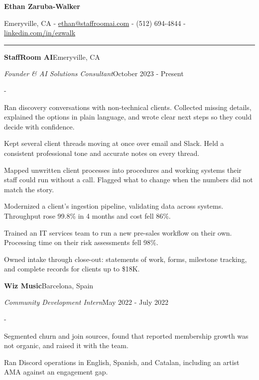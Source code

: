 \documentclass[10pt,letterpaper]{article}
\newenvironment{cvitems}{%
  \begin{list}{-}{%
    \setlength{\leftmargin}{12pt}%
    \setlength{\itemsep}{1.2pt}%
    \setlength{\parsep}{0pt}%
    \setlength{\topsep}{1.5pt}%
    \setlength{\partopsep}{0pt}%
    \setlength{\labelwidth}{6pt}%
    \setlength{\labelsep}{6pt}%
    \setlength{\itemindent}{0pt}%
  }%
}{\end{list}}
\newcommand{\cvsection}[1]{%
  \vspace{7pt}%
  \noindent{\bfseries\fontsize{11pt}{13pt}\selectfont\MakeUppercase{#1}}\par
  \vspace{1pt}%
  \noindent\rule{\textwidth}{0.4pt}\par
  \vspace{4pt}%
}
\newcommand{\cventryhead}[4]{%
  \noindent\textbf{#1}\hfill#2\par
  \vspace{0.5pt}%
  \noindent\textit{#3}\hfill#4\par
}
\begin{document}
\begin{center}
  {\bfseries\fontsize{22pt}{24pt}\selectfont Ethan Zaruba-Walker\par}
  \vspace{4pt}
  {\fontsize{10pt}{12pt}\selectfont
    Emeryville, CA
    {-}
    \href{mailto:ethan@staffroomai.com}{ethan@staffroomai.com}
    {-}
    (512) 694-4844
    {-}
    \href{https://linkedin.com/in/ezwalk}{linkedin.com/in/ezwalk}\par}
\end{center}
\vspace{2pt}

\cvsection{Experience}

\cventryhead{StaffRoom AI}{Emeryville, CA}
{Founder \& AI Solutions Consultant}{October 2023 - Present}
\begin{cvitems}
  \item Ran discovery conversations with non-technical clients. Collected missing details, explained the options in plain language, and wrote clear next steps so they could decide with confidence.
  \item Kept several client threads moving at once over email and Slack. Held a consistent professional tone and accurate notes on every thread.
  \item Mapped unwritten client processes into procedures and working systems their staff could run without a call. Flagged what to change when the numbers did not match the story.
  \item Modernized a client's ingestion pipeline, validating data across systems. Throughput rose 99.8\% in 4 months and cost fell 86\%.
  \item Trained an IT services team to run a new pre-sales workflow on their own. Processing time on their risk assessments fell 98\%.
  \item Owned intake through close-out: statements of work, forms, milestone tracking, and complete records for clients up to \$18K.
\end{cvitems}

\vspace{5pt}
\cventryhead{Wiz Music}{Barcelona, Spain}
{Community Development Intern}{May 2022 - July 2022}
\begin{cvitems}
  \item Segmented churn and join sources, found that reported membership growth was not organic, and raised it with the team.
  \item Ran Discord operations in English, Spanish, and Catalan, including an artist AMA against an engagement gap.
\end{cvitems}
\end{document}

